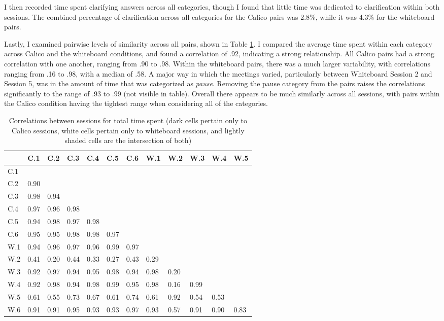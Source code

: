 I then recorded time spent clarifying answers across all categories, though I found that little time was dedicated to clarification within both sessions. The combined percentage of clarification across all categories for the Calico pairs was 2.8\%, while it was 4.3\% for the whiteboard pairs. 

Lastly, I examined pairwise levels of similarity across all pairs, shown in Table \ref{table:3}. I compared the average time spent within each category across Calico and the whiteboard conditions, and found a correlation of .92, indicating a strong relationship. All Calico pairs had a strong correlation with one another, ranging from .90 to .98. Within the whiteboard pairs, there was a much larger variability, with correlations ranging from .16 to .98, with a median of .58. A major way in which the meetings varied, particularly between Whiteboard Session 2 and Session 5, was in the amount of time that was categorized as \emph{pause}. Removing the pause category from the pairs raises the correlations significantly to the range of .93 to .99 (not visible in table). Overall there appears to be much similarly across all sessions, with pairs within the Calico condition having the tightest range when considering all of the categories.

\begin{table}
\centering
\caption{Correlations between sessions for total time spent (dark cells pertain only to Calico sessions, white cells pertain only to whiteboard sessions, and lightly shaded cells are the intersection of both)}
\begin{tabular}{ p{0.5cm}p{0.5cm}p{0.5cm}p{0.5cm}p{0.5cm}p{0.5cm}p{0.5cm}p{0.5cm}p{0.5cm}p{0.5cm}p{0.5cm}p{0.5cm}}
\toprule
&	C.1 &	C.2 &	C.3 &	C.4 &	C.5 &	C.6 &	W.1 &	W.2 &	W.3 &	W.4 &	W.5 \\
\midrule
C.1 	 & & & & & & & & & & & 								 \\		
C.2  &	0.90 & & & & & & & & & & 								 \\		
C.3 & 	0.98 &	0.94 & & & & & & & & & 							 \\		
C.4 & 	0.97 &	0.96 &	0.98 & & & & & & & & 						 \\		
C.5 & 	0.94 &	0.98 &	0.97 &	0.98 & & & & & & & 						 \\	
C.6 & 	0.95 &	0.95 &	0.98 &	0.98 &	0.97 & & & & & & 					 \\	
W.1 &	0.94 &	0.96 &	0.97 &	0.96 &	0.99 &	0.97 & & & & & 				 \\	
W.2 &	0.41 &	0.20 &	0.44 &	0.33 &	0.27 &	0.43 &	0.29 & & & & 			 \\	
W.3 &	0.92 &	0.97 &	0.94 &	0.95 &	0.98 &	0.94 &	0.98 &	0.20 & & & 			 \\
W.4 &	0.92 &	0.98 &	0.94 &	0.98 &	0.99 &	0.95 &	0.98 &	0.16 &	0.99 & & 		 \\
W.5 &	0.61 &	0.55 &	0.73 &	0.67 &	0.61 &	0.74 &	0.61 &	0.92 &	0.54 &	0.53 & 	 \\
W.6 &	0.91 &	0.91 &	0.95 &	0.93 &	0.93 &	0.97 &	0.93 &	0.57 &	0.91 &	0.90 &	0.83 	\\
\bottomrule
\end{tabular}
\label{table:3}
\end{table}

